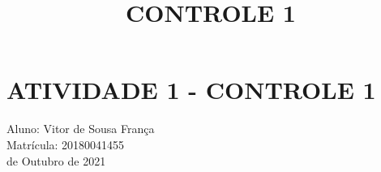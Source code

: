 \documentclass{article}
\title{CONTROLE 1}
\begin{document}
\section*{ATIVIDADE 1 - CONTROLE 1}

\indent Aluno: Vitor de Sousa França\\
\indent Matrícula: 20180041455\\
 de Outubro de 2021\\


\end{document}
